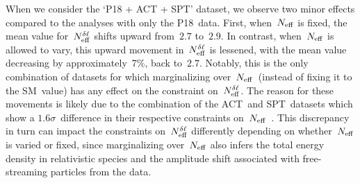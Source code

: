 When we consider the `P18 + ACT + SPT' dataset, we observe two minor effects compared to the analyses with only the P18~data. First, when~$N_\mathrm{eff}$ is fixed, the mean value for~$N_\mathrm{eff}^{\delta\ell}$ shifts upward from~$2.7$ to~$2.9$. In contrast, when~$N_\mathrm{eff}$ is allowed to vary, this upward movement in~$N_\mathrm{eff}^{\delta\ell}$ is lessened, with the mean value decreasing by approximately~7\%, back to~$2.7$. Notably, this is the only combination of datasets for which marginalizing over~$N_\mathrm{eff}$~(instead of fixing it to the SM~value) has any effect on the constraint on~$N_\mathrm{eff}^{\delta\ell}$. The reason for these movements is likely due to the combination of the ACT~and SPT~datasets which show a $1.6\sigma$~difference in their respective constraints on~$N_\mathrm{eff}$~\cite{ACT:2020gnv, SPT-3G:2022hvq}. This discrepancy in turn can impact the constraints on~$N_\mathrm{eff}^{\delta\ell}$ differently depending on whether~$N_\mathrm{eff}$ is varied or fixed, since marginalizing over~$N_\mathrm{eff}$ also infers the total energy density in relativistic species and the amplitude shift associated with free-streaming particles from the data.


